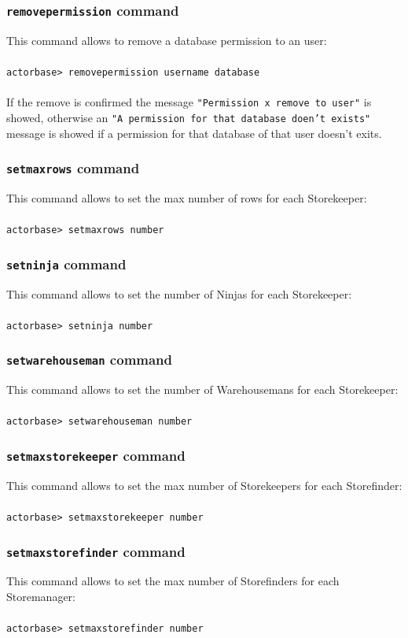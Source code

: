 \documentclass[a4paper]{article}
\begin{document}
	\subsubsection{\texttt{removepermission} command}
	This command allows to remove a database permission to an user:
	\\ \\
	\texttt{actorbase>	removepermission username database}
	\\ \\
	If the remove is confirmed the message \texttt{"Permission x remove to user"} is showed, otherwise an \texttt{"A permission for that database doen't exists"} message is showed if a permission for that database of that user doesn't exits.
	
	\subsubsection{\texttt{setmaxrows} command}
	This command allows to set the max number of rows for each Storekeeper:
	\\ \\
	\texttt{actorbase>	setmaxrows number}

	\subsubsection{\texttt{setninja} command}
	This command allows to set the number of Ninjas for each Storekeeper:
	\\ \\
	\texttt{actorbase>	setninja number}
	
	\subsubsection{\texttt{setwarehouseman} command}
	This command allows to set the number of Warehousemans for each Storekeeper:
	\\ \\
	\texttt{actorbase>	setwarehouseman number}
	
	\subsubsection{\texttt{setmaxstorekeeper} command}
	This command allows to set the max number of Storekeepers for each Storefinder:
	\\ \\
	\texttt{actorbase>	setmaxstorekeeper number}

	\subsubsection{\texttt{setmaxstorefinder} command}
	This command allows to set the max number of Storefinders for each Storemanager:
	\\ \\
	\texttt{actorbase>	setmaxstorefinder number}
	
	\cleardoublepage
	\listoffigures
	
	\cleardoublepage
	\listoftables
		
\end{document}

